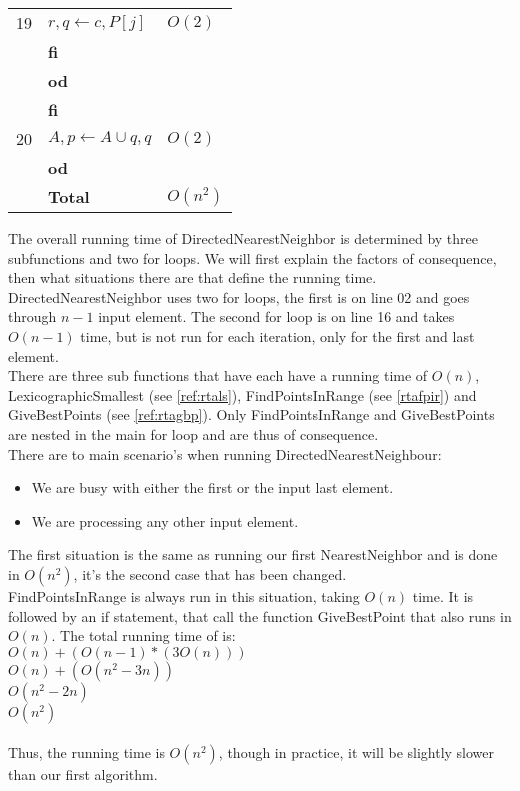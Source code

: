 \documentclass[]{article}
\begin{document}
\begin{tabular}{lll}
    19 & \qquad \qquad \qquad \qquad  $r,q \gets c, P[j]$               & $O(2)$\\
     & \qquad \qquad \qquad \textbf{fi} & \\
     & \qquad \qquad \textbf{od} & \\
      & \qquad \textbf{fi} & \\
    20 & \qquad $A,p \gets A \cup {q},q$                                & $O(2)$\\
    & \textbf{od}&     \\ \hline
    &  \qquad \qquad \qquad\qquad\qquad\qquad\qquad \textbf{Total }  & $O(n^{2})$ 
    \end{tabular}
    
    The overall running time of DirectedNearestNeighbor is determined by three subfunctions and two for loops. We will first explain the factors of consequence, then what situations there are that define the running time.
    DirectedNearestNeighbor uses two for loops, the first is on line 02 and goes through $n-1$ input element. The second for loop is on line 16 and takes $O(n-1)$ time, but is not run for each iteration, only for the first and last element. \\
    There are three sub functions that have each have a running time of $O(n)$, LexicographicSmallest (see \ref{ref:rtals}), FindPointsInRange (see \ref{rtafpir}) and GiveBestPoints (see \ref{ref:rtagbp}). Only FindPointsInRange and GiveBestPoints are nested in the main for loop and are thus of consequence.\\
    There are to main scenario's when running DirectedNearestNeighbour:
    \begin{itemize}
      \item We are busy with either the first or the input last element.
      \item We are processing any other input element.
    \end{itemize}
     
     The first situation is the same as running our first NearestNeighbor and is done in $O(n^{2})$, it's the second case that has been changed.\\
     FindPointsInRange is always run in this situation, taking $O(n)$ time. It is followed by an if statement, that call the function GiveBestPoint that also runs in $O(n)$. The total running time of is: \\

         $O(n) + (O(n-1)*(3O(n)))$ \\
         $O(n) + ( O(n^{2}-3n) )$ \\
         $O(n^{2} -2n)$\\
         $O(n^{2})$ \\ \\
      Thus, the running time is $O(n^{2})$, though in practice, it will be slightly slower than our first algorithm.
    
\end{document}
